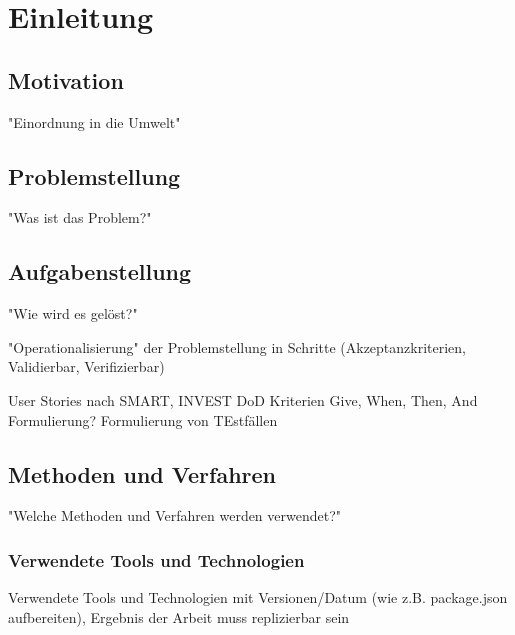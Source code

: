 \chapter{Einleitung}

\section{Motivation}
"Einordnung in die Umwelt"
\section{Problemstellung}
"Was ist das Problem?"
\section{Aufgabenstellung}
"Wie wird es gelöst?"

"Operationalisierung" der Problemstellung in Schritte (Akzeptanzkriterien, Validierbar, Verifizierbar)

User Stories nach
SMART, INVEST
DoD Kriterien
Give, When, Then, And Formulierung?
Formulierung von TEstfällen

\section{Methoden und Verfahren}
"Welche Methoden und Verfahren werden verwendet?"
\subsection{Verwendete Tools und Technologien}
Verwendete Tools und Technologien mit Versionen/Datum (wie z.B. package.json aufbereiten), Ergebnis der Arbeit muss replizierbar sein
